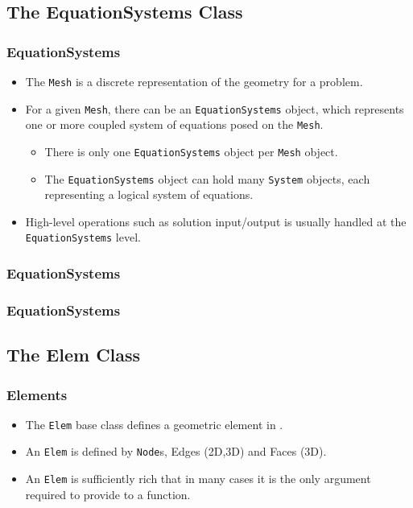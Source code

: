 \subsection{The EquationSystems Class}
\begin{frame}
  \frametitle{EquationSystems}
  \begin{block}{}
    \begin{itemize}
      \item The \texttt{Mesh} is a discrete representation of the geometry for a problem.
      \item For a given \texttt{Mesh}, there can be an \texttt{EquationSystems} object, which represents one or more coupled system of equations posed on the \texttt{Mesh}.
        \begin{itemize}
          \item There is only one \texttt{EquationSystems} object per \texttt{Mesh} object.
          \item The \texttt{EquationSystems} object can hold many \texttt{System} objects, each representing a logical system of equations.
        \end{itemize}
      \item High-level operations such as solution input/output is usually handled at the \texttt{EquationSystems} level.
    \end{itemize}
  \end{block}
\end{frame}

\begin{frame}[shrink]
  \frametitle{EquationSystems}
  
\end{frame}

\begin{frame}[shrink]
  \frametitle{EquationSystems}
  
\end{frame}
 



\subsection{The Elem Class}
\begin{frame}
  \frametitle{Elements}
  \begin{block}{}
    \begin{itemize}
      \item The \texttt{Elem} base class defines a geometric element in \libMesh{}.
      \item An \texttt{Elem} is defined by \texttt{Node}s, Edges (2D,3D) and Faces (3D).
      \item An \texttt{Elem} is sufficiently rich that in many cases it is the only argument required to provide to a function.
    \end{itemize}
  \end{block}
\end{frame}

